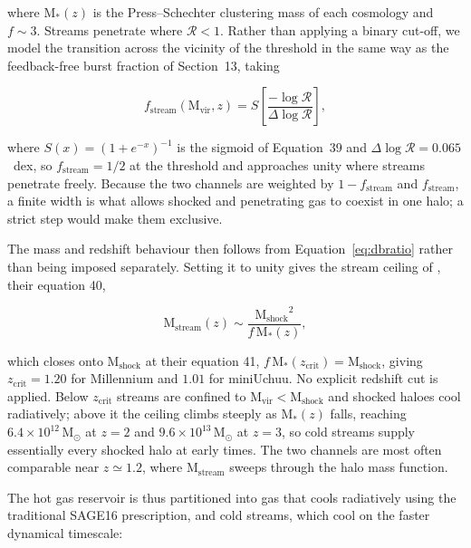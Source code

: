 where $\mathrm{M_*}(z)$ is the Press--Schechter clustering mass of each
cosmology and $f \sim 3$. Streams penetrate where $\mathcal{R} < 1$. Rather
than applying a binary cut-off, we model the transition across the vicinity of
the threshold in the same way as the feedback-free burst fraction of
Section~13, taking

\begin{equation}
f_{\mathrm{stream}}(\mathrm{M_{vir}}, z) = S
\left[ \frac{-\log \mathcal{R}}{\Delta \log \mathcal{R}} \right],
\label{eq:fstream}
\end{equation}

where $S(x) = (1 + e^{-x})^{-1}$ is the sigmoid of Equation~39 and
$\Delta \log \mathcal{R} = 0.065$~dex, so $f_{\mathrm{stream}} = 1/2$ at the
threshold and approaches unity where streams penetrate freely. Because the two
channels are weighted by $1 - f_{\mathrm{stream}}$ and $f_{\mathrm{stream}}$, a
finite width is what allows shocked and penetrating gas to coexist in one halo;
a strict step would make them exclusive.

The mass and redshift behaviour then follows from Equation~\ref{eq:dbratio}
rather than being imposed separately. Setting it to unity gives the stream
ceiling of \citet{DekelBirnboim2006}, their equation 40,

\begin{equation}
\mathrm{M_{stream}}(z) \sim \frac{\mathrm{M_{shock}}^2}{f\, \mathrm{M_*}(z)},
\label{eq:mstream_ceiling}
\end{equation}

which closes onto $\mathrm{M_{shock}}$ at their equation 41,
$f\,\mathrm{M_*}(z_{\mathrm{crit}}) = \mathrm{M_{shock}}$, giving
$z_{\mathrm{crit}} = 1.20$ for Millennium and $1.01$ for miniUchuu. No explicit
redshift cut is applied. Below $z_{\mathrm{crit}}$ streams are confined to
$\mathrm{M_{vir}} < \mathrm{M_{shock}}$ and shocked haloes cool radiatively;
above it the ceiling climbs steeply as $\mathrm{M_*}(z)$ falls, reaching
$6.4 \times 10^{12}\,\mathrm{M_\odot}$ at $z = 2$ and
$9.6 \times 10^{13}\,\mathrm{M_\odot}$ at $z = 3$, so cold streams supply
essentially every shocked halo at early times. The two channels are most often
comparable near $z \simeq 1.2$, where $\mathrm{M_{stream}}$ sweeps through the
halo mass function.

The hot gas reservoir is thus partitioned into gas that cools radiatively using
the traditional SAGE16 prescription, and cold streams, which cool on the faster
dynamical timescale:

